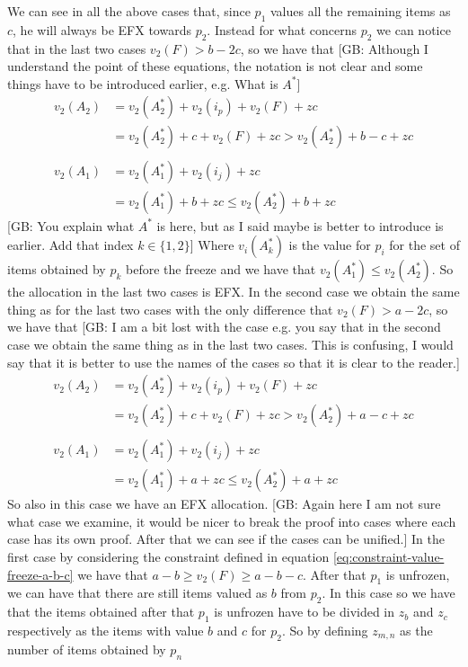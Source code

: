 \documentclass{article}
\newcommand{\gb}[1]{{\color{red}[GB: #1]}}
\begin{document}
We can see in all the above cases that, since $p_1$ values all the remaining items as $c$, he will always be EFX towards $p_2$. Instead for what concerns $p_2$ we can notice that in the last two cases $v_2(F) > b-2c$, so we have that 
\gb{Although I understand the point of these equations, the notation is not clear and some things have to be introduced earlier, e.g. What is $A^*$}
\begin{align*}
    v_2(A_2) &= v_2(A_2^*) + v_2(i_p) + v_2(F) + zc\\
    &= v_2(A_2^*) + c + v_2(F) + zc > v_2(A_2^*) + b-c + zc\\
    \\
    v_2(A_1) &= v_2(A_1^*) + v_2(i_j) + zc\\
    &=v_2(A_1^*) + b + zc\le v_2(A_2^*) + b + zc
\end{align*}
\gb{You explain what $A^*$ is here, but as I said maybe is better to introduce is earlier. Add that index $k \in \{1,2\}$}
Where $v_i(A_k^*)$ is the value for $p_i$ for the set of items obtained by $p_k$ before the freeze and we have that $v_2(A_1^*)\le v_2(A_2^*)$.
So the allocation in the last two cases is EFX. In the second case we obtain the same thing as for the last two cases with the only difference that $v_2(F) > a-2c$, so we have that \gb{I am a bit lost with the case e.g. you say that in the second case we obtain the same thing as in the last two cases. This is confusing, I would say that it is better to use the names of the cases so that it is clear to the reader.}
\begin{align*}
    v_2(A_2) &= v_2(A_2^*) + v_2(i_p) + v_2(F) + zc\\
    &= v_2(A_2^*) + c + v_2(F) + zc > v_2(A_2^*) + a-c + zc\\\\
    v_2(A_1) &= v_2(A_1^*) + v_2(i_j) + zc\\
    &=v_2(A_1^*) + a + zc\le v_2(A_2^*) + a + zc
\end{align*}
So also in this case we have an EFX allocation.
\gb{Again here I am not sure what case we examine, it would be nicer to break the proof into cases where each case has its own proof. After that we can see if the cases can be unified.} 
In the first case by considering the constraint defined in equation \ref{eq:constraint-value-freeze-a-b-c} we have that $a-b\ge v_2(F)\ge a-b-c$. After that $p_1$ is unfrozen, we can have that there are still items valued as $b$ from $p_2$. In this case so we have that the items obtained after that $p_1$ is unfrozen have to be divided in $z_b$ and $z_c$ respectively as the items with value $b$ and $c$ for $p_2$. So by defining $z_{m,n}$ as the number of items obtained by $p_n$ 
\end{document}
